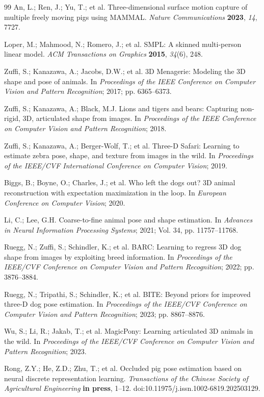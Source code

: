 \documentclass[computers,article,submit,pdftex,moreauthors]{Definitions/mdpi}
\begin{document}
\begin{thebibliography}{99}
 An, L.; Ren, J.; Yu, T.; et al. Three-dimensional surface motion capture of multiple freely moving pigs using MAMMAL. \textit{Nature Communications} \textbf{2023}, \textit{14}, 7727.

 Loper, M.; Mahmood, N.; Romero, J.; et al. SMPL: A skinned multi-person linear model. \textit{ACM Transactions on Graphics} \textbf{2015}, \textit{34}(6), 248.

 Zuffi, S.; Kanazawa, A.; Jacobs, D.W.; et al. 3D Menagerie: Modeling the 3D shape and pose of animals. In \textit{Proceedings of the IEEE Conference on Computer Vision and Pattern Recognition}; 2017; pp. 6365--6373.

 Zuffi, S.; Kanazawa, A.; Black, M.J. Lions and tigers and bears: Capturing non-rigid, 3D, articulated shape from images. In \textit{Proceedings of the IEEE Conference on Computer Vision and Pattern Recognition}; 2018.

 Zuffi, S.; Kanazawa, A.; Berger-Wolf, T.; et al. Three-D Safari: Learning to estimate zebra pose, shape, and texture from images in the wild. In \textit{Proceedings of the IEEE/CVF International Conference on Computer Vision}; 2019.

 Biggs, B.; Boyne, O.; Charles, J.; et al. Who left the dogs out? 3D animal reconstruction with expectation maximization in the loop. In \textit{European Conference on Computer Vision}; 2020.

 Li, C.; Lee, G.H. Coarse-to-fine animal pose and shape estimation. In \textit{Advances in Neural Information Processing Systems}; 2021; Vol. 34, pp. 11757--11768.

 Ruegg, N.; Zuffi, S.; Schindler, K.; et al. BARC: Learning to regress 3D dog shape from images by exploiting breed information. In \textit{Proceedings of the IEEE/CVF Conference on Computer Vision and Pattern Recognition}; 2022; pp. 3876--3884.

 Ruegg, N.; Tripathi, S.; Schindler, K.; et al. BITE: Beyond priors for improved three-D dog pose estimation. In \textit{Proceedings of the IEEE/CVF Conference on Computer Vision and Pattern Recognition}; 2023; pp. 8867--8876.

 Wu, S.; Li, R.; Jakab, T.; et al. MagicPony: Learning articulated 3D animals in the wild. In \textit{Proceedings of the IEEE/CVF Conference on Computer Vision and Pattern Recognition}; 2023.

 Rong, Z.Y.; He, Z.D.; Zhu, T.; et al. Occluded pig pose estimation based on neural discrete representation learning. \textit{Transactions of the Chinese Society of Agricultural Engineering} \textbf{in press}, 1--12. doi:10.11975/j.issn.1002-6819.202503129.


\end{thebibliography}
\end{document}
